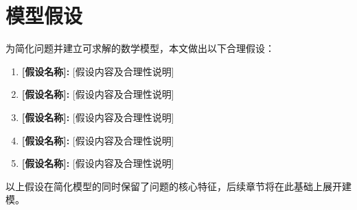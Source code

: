 
\section{模型假设}

为简化问题并建立可求解的数学模型，本文做出以下合理假设：

\begin{enumerate}
    \item \textbf{[假设名称]:} [假设内容及合理性说明]
    \item \textbf{[假设名称]:} [假设内容及合理性说明]
    \item \textbf{[假设名称]:} [假设内容及合理性说明]
    \item \textbf{[假设名称]:} [假设内容及合理性说明]
    \item \textbf{[假设名称]:} [假设内容及合理性说明]
\end{enumerate}

以上假设在简化模型的同时保留了问题的核心特征，后续章节将在此基础上展开建模。
